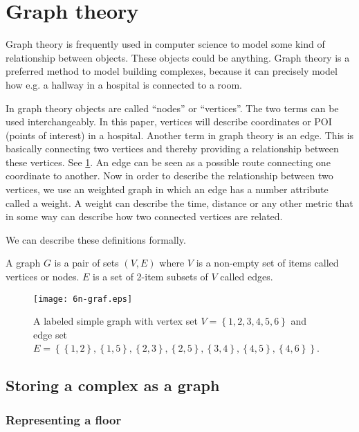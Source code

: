 \section{Graph theory}

Graph theory is frequently used in computer science to model some kind of relationship between objects. These objects could be anything. Graph theory is a preferred method to model building complexes, because it can precisely model how e.g. a hallway in a hospital is connected to a room.

In graph theory objects are called \enquote{nodes} or \enquote{vertices}. The two terms can be used interchangeably. In this paper, vertices will describe coordinates or POI (points of interest) in a hospital. Another term in graph theory is an edge. This is basically connecting two vertices and thereby providing a relationship between these vertices. See \cref{fig:labeled_graph}. An edge can be seen as a possible route connecting one coordinate to another. Now in order to describe the relationship between two vertices, we use an weighted graph in which an edge has a number attribute called a weight. A weight can describe the time, distance or any other metric that in some way can describe how two connected vertices are related.\cite{wiki_graph_glos,MIT2012}

We can describe these definitions formally.\cite{MIT2012}
\begin{mydef}
	A graph $G$ is a pair of sets $(V,E)$ where $V$ is a non-empty set of items called vertices or nodes. $E$ is a set of 2-item subsets of $V$ called edges.
\end{mydef}

\begin{figure}[ht!]
    \centering
    \texttt{[image: 6n-graf.eps]}
    \caption{A labeled simple graph with vertex set $V = \left\{ {1, 2, 3, 4, 5, 6} \right\} $ and edge set $E = \left\{ \left\{ {1,2}\right\}, \left\{ {1,5}\right\}, \left\{ {2,3}\right\}, \left\{ {2,5}\right\}, \left\{ {3,4}\right\}, \left\{ {4,5} \right\} , \left\{ {4,6} \right\} \right\}$. \cite{wiki_graph_glos}}
    \label{fig:labeled_graph}
  \end{figure}

\subsection{Storing a complex as a graph}

\subsubsection{Representing a floor}

